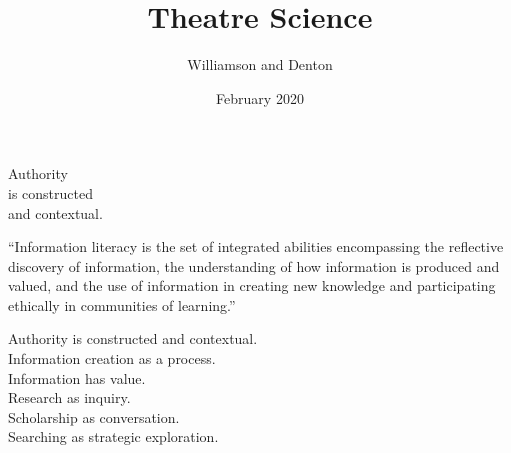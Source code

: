 \documentclass[17pt]{extarticle}
\title{Theatre Science}
\author{Williamson and Denton}
\date{February 2020}
\begin{document}
\maketitle

\newpage


\vspace*{1in}

{\Huge

\begin{center}

  Authority \\
  is constructed \\
  and contextual.

\end{center}

}

\newpage


{\Huge

  \begin{center}

``Information literacy is the set of integrated abilities encompassing the reflective discovery of information, the understanding of how information is produced and valued, and the use of information in creating new knowledge and participating ethically in communities of learning.''

    \end{center}

}



\newpage


\vspace*{1in}

{\LARGE

  \begin{center}

    Authority is constructed and contextual. \\
    Information creation as a process. \\
    Information has value. \\
    Research as inquiry. \\
    Scholarship as conversation. \\
    Searching as strategic exploration.

    \end{center}

}
\end{document}
